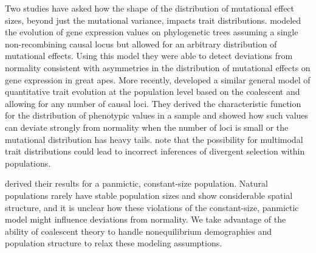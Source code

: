 Two studies have asked how the shape of the distribution of mutational effect
sizes, beyond just the mutational variance, impacts trait
distributions. \citet{Khaitovich2005} modeled the evolution of gene expression
values on phylogenetic trees assuming a single non-recombining causal locus but
allowed for an arbitrary distribution of mutational effects. Using this model
they were able to detect deviations from normality consistent with asymmetries
in the distribution of mutational effects on gene expression in great apes. More
recently, \citet{Schraiber2015} developed a similar general model of
quantitative trait evolution at the population level based on the coalescent and
allowing for any number of causal loci. They derived the characteristic function
for the distribution of phenotypic values in a sample and showed how such values
can deviate strongly from normality when the number of loci is small or the
mutational distribution has heavy tails. \citet{Schraiber2015} note that the
possibility for multimodal trait distributions could lead to incorrect
inferences of divergent selection within populations.

\citet{Schraiber2015} derived their results for a panmictic, constant-size
population. Natural populations rarely have stable population sizes and show
considerable spatial structure, and it is unclear how these violations of the
constant-size, panmictic model might influence deviations from normality. We
take advantage of the ability of coalescent theory to handle nonequilibrium
demographies and population structure to relax these modeling assumptions.

